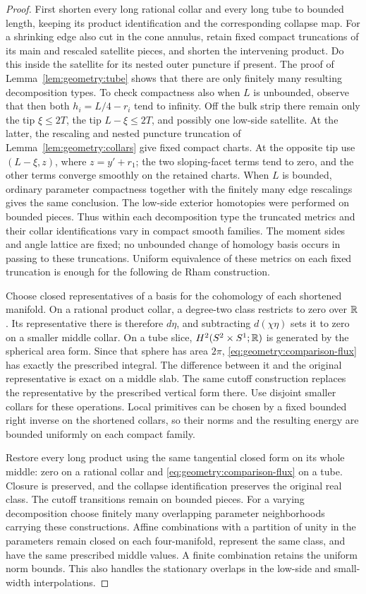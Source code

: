 \begin{proof}
First shorten every long rational collar and every
long tube to bounded length, keeping its product
identification and the corresponding collapse map.
For a shrinking edge also cut in the cone annulus,
retain fixed compact truncations of its main and
rescaled satellite pieces, and shorten the intervening
product.  Do this inside the satellite for its nested
outer puncture if present.  The proof of
Lemma~\ref{lem:geometry:tube} shows that there are only
finitely many resulting decomposition types.  To check
compactness also when $L$ is unbounded, observe that then
both $h_i=L/4-r_i$ tend to infinity.  Off the bulk strip
there remain only the tip $\xi\le2T$, the tip
$L-\xi\le2T$, and possibly one low-side satellite.
At the latter, the rescaling and nested puncture
truncation of Lemma~\ref{lem:geometry:collars} give
fixed compact charts.  At the opposite tip use
$(L-\xi,z)$, where $z=y'+r_1$; the two sloping-facet
terms tend to zero, and the other terms converge
smoothly on the retained charts.  When $L$ is bounded,
ordinary parameter compactness together with the
finitely many edge rescalings gives the same conclusion.
The low-side exterior homotopies were performed on
bounded pieces.  Thus within each decomposition type
the truncated metrics and their collar identifications
vary in compact smooth families.
The moment sides and angle lattice are fixed; no
unbounded change of homology basis occurs in passing
to these truncations.  Uniform equivalence of these
metrics on each fixed truncation is enough for the
following de Rham construction.

Choose closed representatives of a basis for the
cohomology of each shortened manifold.  On a rational
product collar, a degree-two class restricts to zero
over $\mathbb R$.  Its representative there is therefore
$d\eta$, and subtracting $d(\chi\eta)$ sets it to
zero on a smaller middle collar.  On a tube slice,
$H^2(S^2\times S^1;\mathbb R)$ is generated by the spherical
area form.  Since that sphere has area $2\pi$,
\eqref{eq:geometry:comparison-flux} has exactly the
prescribed integral.  The difference between it and
the original representative is exact on a middle
slab.  The same cutoff construction replaces the
representative by the prescribed vertical form
there.  Use disjoint smaller collars for these
operations.  Local primitives can be chosen by a
fixed bounded right inverse on the shortened
collars, so their norms and the resulting energy
are bounded uniformly on each compact family.

Restore every long product using the same tangential
closed form on its whole middle: zero on a rational
collar and \eqref{eq:geometry:comparison-flux} on a
tube.  Closure is preserved, and the collapse
identification preserves the original real class.
The cutoff transitions remain on bounded pieces.
For a varying decomposition choose finitely many
overlapping parameter neighborhoods carrying these
constructions.  Affine combinations with a partition
of unity in the parameters remain closed on each
four-manifold, represent the same class, and have
the same prescribed middle values.  A finite
combination retains the uniform norm bounds.  This
also handles the stationary overlaps in the low-side
and small-width interpolations.


\end{proof}
